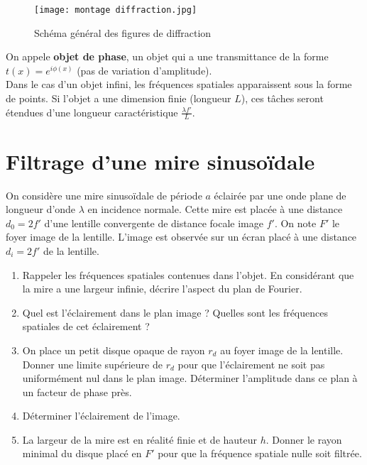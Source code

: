 \documentclass{article}
\begin{document}
\begin{figure}[h]
  \centering
  \texttt{[image: montage diffraction.jpg]}
  \caption{Schéma général des figures de diffraction}
\end{figure}

On appele \textbf{objet de phase}, un objet qui a une transmittance de la forme $t(x) = e^{i \phi(x)}$ (pas de variation d'amplitude). \\
Dans le cas d'un objet infini, les fréquences spatiales apparaissent sous la forme de points. 
Si l'objet a une dimension finie (longueur $L$), ces tâches seront étendues d'une longueur caractéristique $\frac{\lambda f'}{L}$. 



\section{Filtrage d'une mire sinusoïdale}

On considère une mire sinusoïdale de période $a$ éclairée par une onde plane de longueur d'onde $\lambda$ en incidence normale. 
Cette mire est placée à une distance $d_0 = 2 f'$ d'une lentille convergente de distance focale image $f'$.
On note $F'$ le foyer image de la lentille.
L'image est observée sur un écran placé à une distance $d_i = 2f'$ de la lentille.

\begin{enumerate}
  \item Rappeler les fréquences spatiales contenues dans l'objet. En considérant que la mire a une largeur infinie, décrire l'aspect du plan de Fourier. 
  \item Quel est l'éclairement dans le plan image ? Quelles sont les fréquences spatiales de cet éclairement ? 
  \item On place un petit disque opaque de rayon $r_d$ au foyer image de la lentille. Donner une limite supérieure de $r_d$ pour que l'éclairement ne soit pas uniformément nul dans le plan image. Déterminer l'amplitude dans ce plan à un facteur de phase près. 
  \item Déterminer l'éclairement de l'image. 
  \item La largeur de la mire est en réalité finie et de hauteur $h$. Donner le rayon minimal du disque placé en $F'$ pour que la fréquence spatiale nulle soit filtrée. 
  
\end{enumerate}
\end{document}
